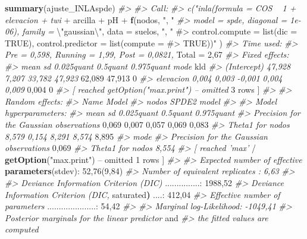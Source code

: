 \documentclass[11pt,b5paper,]{krantz}
\newenvironment{Shaded}{}{}
\newcommand{\KeywordTok}[1]{\textcolor[rgb]{0.00,0.44,0.13}{\textbf{#1}}}
\newcommand{\DecValTok}[1]{\textcolor[rgb]{0.25,0.63,0.44}{#1}}
\newcommand{\CharTok}[1]{\textcolor[rgb]{0.25,0.44,0.63}{#1}}
\newcommand{\StringTok}[1]{\textcolor[rgb]{0.25,0.44,0.63}{#1}}
\newcommand{\CommentTok}[1]{\textcolor[rgb]{0.38,0.63,0.69}{\textit{#1}}}
\newcommand{\OperatorTok}[1]{\textcolor[rgb]{0.40,0.40,0.40}{#1}}
\newcommand{\ErrorTok}[1]{\textcolor[rgb]{1.00,0.00,0.00}{\textbf{#1}}}
\newcommand{\NormalTok}[1]{#1}
\begin{document}
\begin{Shaded}
\begin{Highlighting}[]
\KeywordTok{summary}\NormalTok{(ajuste_INLAspde)}
\CommentTok{#>}
\CommentTok{#> Call:}
\CommentTok{#> c("inla(formula = COS ~ 1 + elevacion + twi}
\OperatorTok{+}\StringTok{ }\NormalTok{arcilla }\OperatorTok{+}\StringTok{ }\NormalTok{pH }\OperatorTok{+}\StringTok{ }\KeywordTok{f}\NormalTok{(nodos, }\StringTok{", "}
\CommentTok{#> model = spde, diagonal = 1e-06), family =}
\NormalTok{\textbackslash{}}\StringTok{"gaussian}\CharTok{\textbackslash{}"}\StringTok{, data = suelos, "}\NormalTok{, }\StringTok{"}
\StringTok{#> control.compute = list(dic = TRUE),}
\StringTok{control.predictor = list(compute =}
\StringTok{#> TRUE))"}\NormalTok{ )}
\CommentTok{#> Time used:}
\CommentTok{#> Pre = 0,598, Running = 1,99, Post = 0,0821,}
\NormalTok{Total =}\StringTok{ }\DecValTok{2}\NormalTok{,}\DecValTok{67}
\CommentTok{#> Fixed effects:}
\CommentTok{#> mean sd 0.025quant 0.5quant 0.975quant mode}
\NormalTok{kld}
\CommentTok{#> (Intercept) 47,928 7,207 33,782 47,923}
\DecValTok{62}\NormalTok{,}\DecValTok{089} \DecValTok{47}\NormalTok{,}\DecValTok{913} \DecValTok{0}
\CommentTok{#> elevacion 0,004 0,003 -0,001 0,004 0,009}
\DecValTok{0}\NormalTok{,}\DecValTok{004} \DecValTok{0}
\CommentTok{#> [ reached getOption("max.print") -- omitted}
\DecValTok{3}\NormalTok{ rows ]}
\CommentTok{#>}
\CommentTok{#> Random effects:}
\CommentTok{#> Name Model}
\CommentTok{#> nodos SPDE2 model}
\CommentTok{#>}
\CommentTok{#> Model hyperparameters:}
\CommentTok{#> mean sd 0.025quant 0.5quant 0.975quant}
\CommentTok{#> Precision for the Gaussian observations}
\DecValTok{0}\NormalTok{,}\DecValTok{069} \DecValTok{0}\NormalTok{,}\DecValTok{007} \DecValTok{0}\NormalTok{,}\DecValTok{057} \DecValTok{0}\NormalTok{,}\DecValTok{069} \DecValTok{0}\NormalTok{,}\DecValTok{083}
\CommentTok{#> Theta1 for nodos 8,579 0,154 8,291 8,574}
\DecValTok{8}\NormalTok{,}\DecValTok{895}
\CommentTok{#> mode}
\CommentTok{#> Precision for the Gaussian observations}
\DecValTok{0}\NormalTok{,}\DecValTok{069}
\CommentTok{#> Theta1 for nodos 8,554}
\CommentTok{#> [ reached 'max'}
    \OperatorTok{/}\StringTok{ }\KeywordTok{getOption}\NormalTok{(}\StringTok{"max.print"}\NormalTok{) }\OperatorTok{--}
\NormalTok{omitted }\DecValTok{1}\NormalTok{ rows ]}
\CommentTok{#>}
\CommentTok{#> Expected number of effective}
\KeywordTok{parameters}\NormalTok{(stdev)}\OperatorTok{:}\StringTok{ }\DecValTok{52}\NormalTok{,}\DecValTok{76}\NormalTok{(}\DecValTok{9}\NormalTok{,}\DecValTok{84}\NormalTok{)}
\CommentTok{#> Number of equivalent replicates : 6,63}
\CommentTok{#>}
\CommentTok{#> Deviance Information Criterion (DIC)}
\NormalTok{...............}\OperatorTok{:}\StringTok{ }\DecValTok{1988}\NormalTok{,}\DecValTok{52}
\CommentTok{#> Deviance Information Criterion (DIC,}
\NormalTok{saturated}\ErrorTok{)}\NormalTok{ ....}\OperatorTok{:}\StringTok{ }\DecValTok{412}\NormalTok{,}\DecValTok{04}
\CommentTok{#> Effective number of parameters}
\NormalTok{.....................}\OperatorTok{:}\StringTok{ }\DecValTok{54}\NormalTok{,}\DecValTok{42}
\CommentTok{#>}
\CommentTok{#> Marginal log-Likelihood: -1049,41}
\CommentTok{#> Posterior marginals for the linear predictor}
\NormalTok{and}
\CommentTok{#> the fitted values are computed}
\end{Highlighting}
\end{Shaded}
\end{document}
